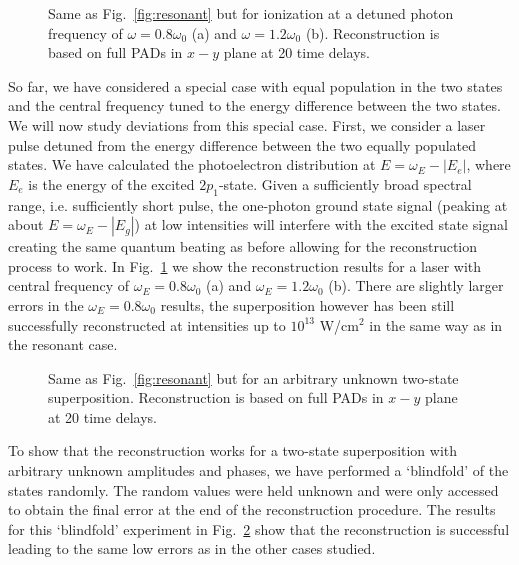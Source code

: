 \begin{figure}[t]
\centering
\caption{
Same as Fig.\ \ref{fig:resonant} but for ionization at a detuned photon frequency of $\omega=0.8\omega_0$ (a) and $\omega=1.2\omega_0$ (b).
Reconstruction is based on full PADs in $x-y$ plane at 20 time delays.
} 
  \label{fig:detuned_reconstruct}
\end{figure}

So far, we have considered a special case with equal population in the two states and the central frequency tuned to the energy difference between the two states. We will now study deviations from this special case. First, we consider a laser pulse detuned from the energy difference between the two equally populated states. We have calculated the photoelectron distribution at $E=\omega_E-|E_e|$, where $E_e$ is the energy of the excited $2p_1$-state. Given a sufficiently broad spectral range, i.e. sufficiently short pulse, the one-photon ground state signal (peaking at about $E = \omega_E-|E_g|$) at low intensities will interfere with the excited state signal creating the same quantum beating as before allowing for the reconstruction process to work. In Fig.~\ref{fig:detuned_reconstruct} we show the reconstruction results for a laser with central frequency of $\omega_E = 0.8\omega_0$ (a) and $\omega_E = 1.2\omega_0$ (b). 
There are slightly larger errors in the $\omega_E=0.8\omega_0$ results, the superposition however has been still successfully reconstructed at intensities up to $10^{13}$ W/cm$^2$ in the same way as in the resonant case.

\begin{figure}[t]
\centering
\caption{
Same as Fig.\ \ref{fig:resonant} but for an arbitrary unknown two-state superposition. Reconstruction is based on full PADs in $x-y$ plane at 20 time delays. 
} 
  \label{fig:random_state}
\end{figure}

To show that the reconstruction works for a two-state superposition with arbitrary unknown amplitudes and phases, we have performed a `blindfold' of the states randomly. The random values were held unknown and were only accessed to obtain the final error at the end of the reconstruction procedure. The results for this `blindfold' experiment in Fig.~\ref{fig:random_state} show that the reconstruction is successful leading to the same low errors as in the other cases studied.

